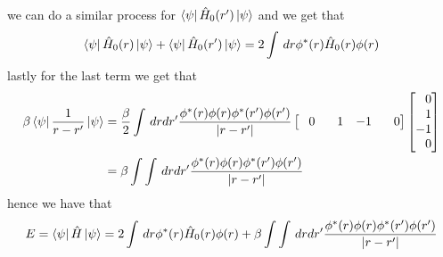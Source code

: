 \documentclass[12pt]{report}
\theoremstyle{custom}
\begin{document}
we can do a similar process for $\bra{\psi} \hat{H}_0(r') \ket{\psi}$ and we get that
\begin{equation*}
\bra{\psi} \hat{H}_0(r) \ket{\psi} + \bra{\psi} \hat{H}_0(r') \ket{\psi} = 2\int \, dr \phi^*(r) \hat{H}_0(r) \phi(r)
\end{equation*}
lastly for the last term we get that
\begin{align*}
    \beta \bra{\psi} \frac{1}{r-r'} \ket{\psi} &= \frac{\beta}{2} \int \, dr dr' \frac{\phi^*(r)\phi(r)\phi^*(r')\phi(r')}{|r - r'|} \begin{bmatrix}
    \phantom{-}0 & \phantom{-}1 & -1 & \phantom{-}0
  \end{bmatrix}\begin{bmatrix}
    \phantom{-}0 \\ \phantom{-}1 \\ -1 \\ \phantom{-}0
  \end{bmatrix} \\
  &= \beta \int\int \, dr dr' \frac{\phi^*(r)\phi(r)\phi^*(r')\phi(r')}{|r - r'|}
\end{align*}
hence we have that 
\begin{equation*}
    E = \bra{\psi} \hat{H} \ket{\psi} =  2\int \, dr \phi^*(r) \hat{H}_0(r) \phi(r) + \beta \int\int \, dr dr' \frac{\phi^*(r)\phi(r)\phi^*(r')\phi(r')}{|r - r'|}
\end{equation*}
\end{document}
